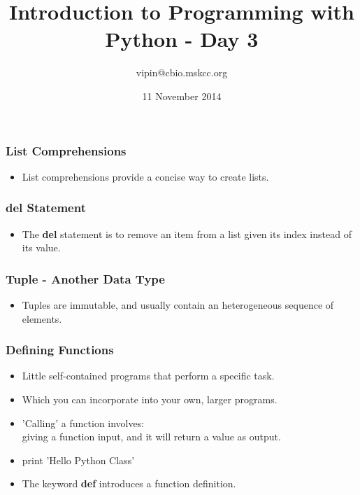\documentclass[11pt]{beamer}
\title[pyClass1]{Introduction to Programming with Python - Day 3}
\author{vipin@cbio.mskcc.org}
\institute[cBio@MSKCC]
{
    R{\"a}tsch Laboratory, Computational Biology Center\\
    Memorial Sloan Kettering Cancer Center\\
}
\date{11 November 2014}
\begin{document}
\maketitle
%
\begin{frame}[plain]
    \frametitle{List Comprehensions}
    \begin{itemize}
        \item[] List comprehensions provide a concise way to create lists. 
        \pause
        
        \pause
        
        \pause
        
        \pause
        
    \end{itemize}
\end{frame}
%
\begin{frame}[plain]
    \frametitle{del Statement}
    \begin{itemize}
        \item[] The \textbf{del} statement is to remove an item from a list given its index instead of its value.
        \newline
        \pause
        
    \end{itemize}
\end{frame}
\begin{frame}[plain]
    \frametitle{Tuple - Another Data Type}
    \begin{itemize}
        \item[] Tuples are immutable, and usually contain an heterogeneous sequence of elements. 
        \newline
        \pause
        
    \end{itemize}
\end{frame}
\begin{frame}[plain]
    \frametitle{Defining Functions}
    \begin{itemize}
        \item[]Little self-contained programs that perform a specific task. 
        \newline
        \pause
        \item[] Which you can incorporate into your own, larger programs.
        \newline
        \pause
        \item[] 'Calling' a function involves: \\ 
        giving a function input, and it will return a value as output.
        \newline
        \pause
        \item[] print 'Hello Python Class'
        \newline
        \pause
        \item[] The keyword \textbf{def} introduces a function definition.
    \end{itemize}
\end{frame}
\end{document}
